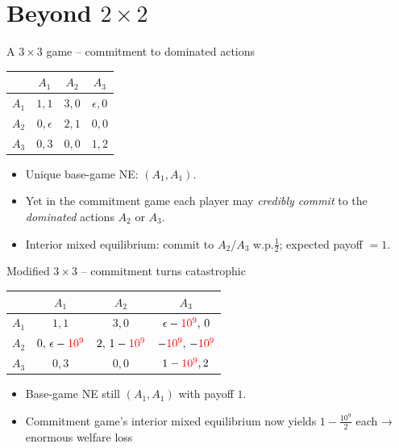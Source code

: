 \documentclass[Output/slides.tex]{subfiles}
\begin{document}
\section{Beyond $2\times2$}
\begin{frame}{A $3\times3$ game – commitment to dominated actions}
\centering
\renewcommand{\arraystretch}{1.25}
\begin{tabular}{c|ccc}
      & $A_1$ & $A_2$ & $A_3$ \\\hline
$A_1$ & $1,1$ & $3,0$   & $\epsilon,0$ \\
$A_2$ & $0,\epsilon$ & $2,1$ & $0,0$ \\
$A_3$ & $0,3$ & $0,0$   & $1,2$
\end{tabular}

\bigskip
\begin{itemize}
  \item Unique base-game NE: \((A_1,A_1)\).
  \item Yet in the commitment game each player may \emph{credibly commit}
        to the \emph{dominated} actions \(A_2\) or \(A_3\).  
  \item Interior mixed equilibrium: commit to \(A_2\)/\(A_3\) w.p.\(\tfrac12\); expected payoff \(=1\).
\end{itemize}
\end{frame}
\begin{frame}{Modified $3\times3$ – commitment turns catastrophic}
\centering
\renewcommand{\arraystretch}{1.25}
\begin{tabular}{c|ccc}
      & $A_1$ & $A_2$ & $A_3$ \\\hline
$A_1$ & $1,1$ & $3,0$ & $\epsilon-\textcolor{red}{10^{9}},\,0$ \\
$A_2$ & $0,\,\epsilon-\textcolor{red}{10^{9}}$
      & $2,\,1-\textcolor{red}{10^{9}}$
      & $-\textcolor{red}{10^{9}},\,-\textcolor{red}{10^{9}}$ \\
$A_3$ & $0,3$ & $0,0$
      & $1-\textcolor{red}{10^{9}}, 2$
\end{tabular}

\bigskip
\begin{itemize}
  \item Base-game NE still \((A_1,A_1)\) with payoff \(1\).
  \item Commitment game’s interior mixed equilibrium now yields
        \(\displaystyle 1-\frac{10^{9}}{2}\) each → enormous welfare loss
\end{itemize}
\end{frame}
\end{document}
